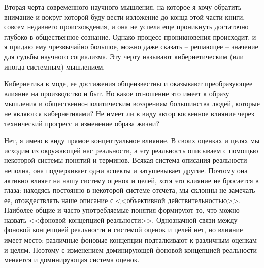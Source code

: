 \documentclass{book}
\begin{document}
Вторая черта современного научного мышления, на которое я хочу обратить внимание и вокруг которой буду вести изло­жение до конца этой части книги, совсем недавнего происхождения, и она не успела еще проникнуть достаточно глубоко в общественное сознание. Однако процесс проникновения происходит, и я придаю ему чрезвычайно большое, можно даже сказать -- решающее -- значение для судьбы научного социа­лизма. Эту черту называют кибернетическим  (или иногда системным) мышлением. 

Кибернетика в моде, ее достижения общеизвестны и оказы­вают преобразующее влияние на производство и быт. Но какое отношение это имеет к образу мышления и общественно-поли­тическим воззрениям большинства людей, которые не являются кибернетиками? Не имеет ли в виду автор косвенное влияние через технический прогресс и изменение образа жизни?

Нет, я имею в виду прямое концептуальное влияние. В своих оценках и целях мы исходим из окружающей нас реальности, а эту реальность описываем с помощью некоторой системы по­нятий и терминов. Всякая система описания реальности непол­на, она подчеркивает одни аспекты и затушевывает другие. Поэтому она активно влияет на нашу систему оценок и целей, хотя это влияние не бросается в глаза: находясь постоянно в некоторой системе отсчета, мы склонны не замечать ее, отож­дествлять наше описание с <<объективной действительностью>>. Наиболее общие и часто употребляемые понятия формируют то, что можно назвать <<фоновой концепцией реальности>>. Одно­значной связи между фоновой концепцией реальности и систе­мой оценок и целей нет, но влияние имеет место: различные фоновые концепции подталкивают к различным оценкам и це­лям. Поэтому с изменением доминирующей фоновой концепцией реальности меняется и доминирующая система оценок.
\end{document}
